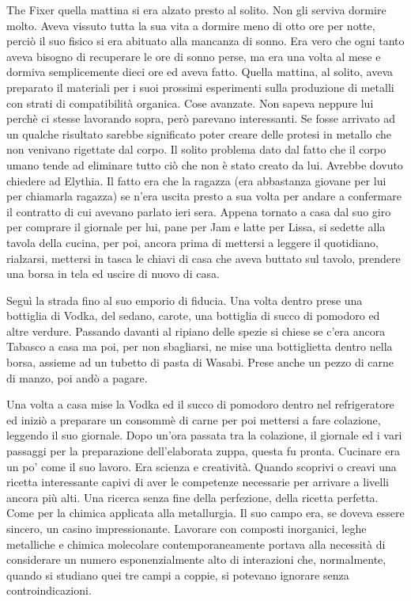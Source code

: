    The Fixer quella mattina si era alzato presto al solito. Non gli
    serviva dormire molto. Aveva vissuto tutta la sua vita a dormire meno
    di otto ore per notte, perciò il suo fisico si era abituato alla
    mancanza di sonno. Era vero che ogni tanto aveva bisogno di recuperare
    le ore di sonno perse, ma era una volta al mese e dormiva semplicemente
    dieci ore ed aveva fatto. Quella mattina, al solito, aveva preparato
    il materiali per i suoi prossimi esperimenti sulla produzione di
    metalli con strati di compatibilità organica. Cose avanzate. Non sapeva
    neppure lui perchè ci stesse lavorando sopra, però parevano
    interessanti. Se fosse arrivato ad un qualche risultato sarebbe
    significato poter creare delle protesi in metallo che non venivano
    rigettate dal corpo. Il solito problema dato dal fatto che il corpo
    umano tende ad eliminare tutto ciò che non è stato creato da lui.
    Avrebbe dovuto chiedere ad Elythia. Il fatto era che la ragazza (era
    abbastanza giovane per lui per chiamarla ragazza) se n'era uscita
    presto a sua volta per andare a confermare il contratto di cui avevano
    parlato ieri sera. Appena tornato a casa dal suo giro per comprare il
    giornale per lui, pane per Jam e latte per Lissa, si sedette
    alla tavola della cucina, per poi, ancora prima di mettersi a leggere
    il quotidiano, rialzarsi, mettersi in tasca le chiavi di casa che aveva buttato
    sul tavolo, prendere una borsa in tela ed uscire di nuovo di casa.

    Seguì la strada fino al suo emporio di fiducia. Una volta dentro prese
    una bottiglia di Vodka, del sedano, carote, una bottiglia
    di succo di pomodoro ed altre verdure. Passando davanti al ripiano delle spezie si
    chiese se c'era ancora Tabasco a casa ma poi, per non sbagliarsi, ne
    mise una bottiglietta dentro nella borsa, assieme ad un tubetto di
    pasta di Wasabi. Prese anche un pezzo di carne di manzo, poi andò a pagare.

    Una volta a casa mise la Vodka ed il succo di pomodoro dentro nel
    refrigeratore ed iniziò a preparare un consommè di carne per poi
    mettersi a fare colazione, leggendo il suo giornale. Dopo un'ora
    passata tra la colazione, il giornale ed i vari passaggi per la
    preparazione dell'elaborata zuppa, questa fu pronta. Cucinare era un
    po' come il suo lavoro. Era scienza e creatività. Quando scoprivi o
    creavi una ricetta interessante capivi di aver le competenze necessarie
    per arrivare a livelli ancora più alti. Una ricerca senza fine della
    perfezione, della ricetta perfetta. Come per la chimica applicata alla
    metallurgia. Il suo campo era, se doveva essere sincero, un casino
    impressionante. Lavorare con composti inorganici, leghe metalliche e
    chimica molecolare contemporaneamente portava alla necessità di
    considerare un numero esponenzialmente alto di interazioni che,
    normalmente, quando si studiano quei tre campi a coppie, si potevano
    ignorare senza controindicazioni.

